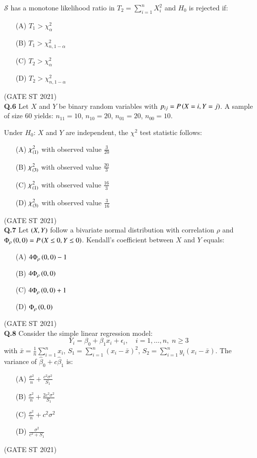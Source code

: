 \documentclass[journal,12pt,onecolumn]{IEEEtran}
\theoremstyle{remark}
\begin{document}
$\mathcal{S}$ has a monotone likelihood ratio in $T_2 = \sum_{i=1}^n X_i^2$ and $H_0$ is rejected if:
\begin{enumerate}
\item[(A)] $T_1 > \chi_\alpha^2$
\item[(B)] $T_1 > \chi_{n,1-\alpha}^2$
\item[(C)] $T_2 > \chi_\alpha^2$
\item[(D)] $T_2 > \chi_{n,1-\alpha}^2$
\end{enumerate}
\hfill (GATE ST 2021) \\


\textbf{Q.6}
Let $X$ and $Y$ be binary random variables with $p_{ij} = P\left(X = i, Y = j\right)$.  
A sample of size $60$ yields: $n_{11} = 10$, $n_{10} = 20$, $n_{01} = 20$, $n_{00} = 10$.

Under $H_0$: $X$ and $Y$ are independent, the $\chi^2$ test statistic follows:

\begin{enumerate}
\item[(A)] $\chi^2_{\left(1\right)}$ with observed value $\frac{3}{20}$
\item[(B)] $\chi^2_{\left(3\right)}$ with observed value $\frac{20}{3}$
\item[(C)] $\chi^2_{\left(1\right)}$ with observed value $\frac{16}{3}$
\item[(D)] $\chi^2_{\left(3\right)}$ with observed value $\frac{3}{16}$
\end{enumerate}
\hfill (GATE ST 2021) \\


\textbf{Q.7}
Let $\left(X,Y\right)$ follow a bivariate normal distribution with correlation $\rho$ and $\Phi_\rho\left(0,0\right)= P\left(X \leq 0, Y \leq 0\right)$.  
Kendall's coefficient between $X$ and $Y$ equals:
\begin{enumerate}
\item[(A)] $4\Phi_\rho\left(0,0\right) - 1$
\item[(B)] $4\Phi_\rho\left(0,0\right)$
\item[(C)] $4\Phi_\rho\left(0,0\right) + 1$
\item[(D)] $\Phi_\rho\left(0,0\right)$
\end{enumerate}
\hfill (GATE ST 2021) \\

\textbf{Q.8}
Consider the simple linear regression model:
\[
Y_i = \beta_0 + \beta_1 x_i + \epsilon_i, \quad i = 1, \dots, n, \; n \geq 3
\]
with $\bar{x} = \frac{1}{n} \sum_{i=1}^n x_i$, $S_1 = \sum_{i=1}^n (x_i - \bar{x})^2$, $S_2 = \sum_{i=1}^n y_i(x_i - \bar{x})$.  
The variance of $\hat{\beta}_0 + c \hat{\beta}_1$ is:
\begin{enumerate}
\item[(A)] $\frac{\sigma^2}{n} + \frac{c^2\sigma^2}{S_1}$
\item[(B)] $\frac{\sigma^2}{n} + \frac{2c^2\sigma^2}{S_1}$
\item[(C)] $\frac{\sigma^2}{n} + c^2\sigma^2$
\item[(D)] $\frac{\sigma^2}{c^2 + S_1}$
\end{enumerate}
\hfill (GATE ST 2021) \\
\end{document}

